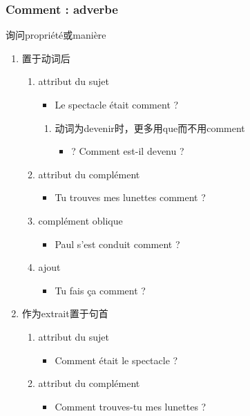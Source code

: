 \documentclass[UTF8]{report}
\begin{document}
\subsubsection{Comment : adverbe}
询问propriété或manière
\begin{enumerate}
    \item 置于动词后
    \begin{enumerate}
        \item attribut du sujet
        \begin{itemize}
            \item Le spectacle était comment ?
        \end{itemize}
        \begin{enumerate}
            \item 动词为devenir时，更多用que而不用comment
            \begin{itemize}
                \item ? Comment est-il devenu ?
            \end{itemize}
        \end{enumerate}
        \item attribut du complément
        \begin{itemize}
            \item Tu trouves mes lunettes comment ?
        \end{itemize}
        \item complément oblique
        \begin{itemize}
            \item Paul s’est conduit comment ?
        \end{itemize}
        \item ajout
        \begin{itemize}
            \item Tu fais ça comment ?
        \end{itemize}
    \end{enumerate}
    \item 作为extrait置于句首
    \begin{enumerate}
        \item attribut du sujet
        \begin{itemize}
            \item Comment était le spectacle ?
        \end{itemize}
        \item attribut du complément
        \begin{itemize}
            \item Comment trouves-tu mes lunettes ?

\end{itemize}
\end{enumerate}
\end{enumerate}
\end{document}
